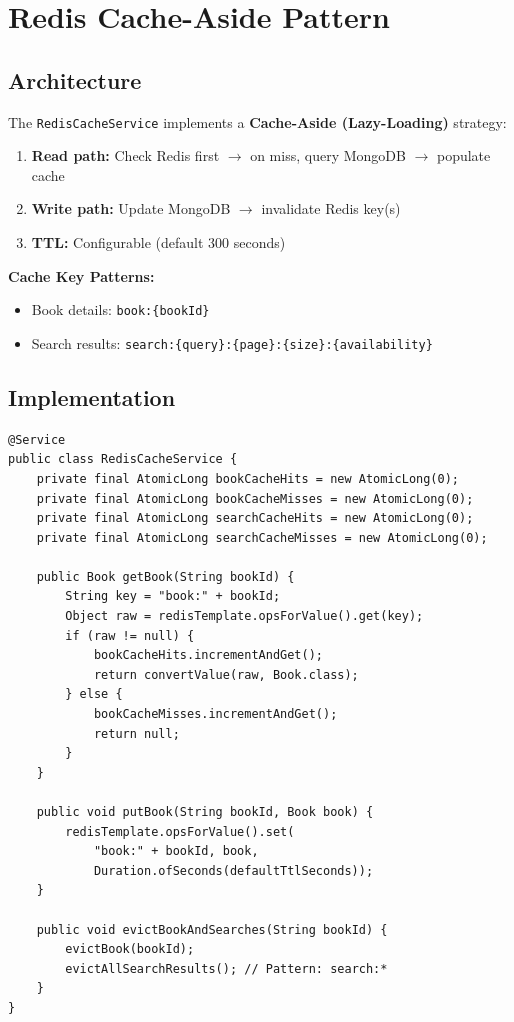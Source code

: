 \documentclass[12pt,a4paper]{report}
\begin{document}
\section{Redis Cache-Aside Pattern}

\subsection{Architecture}
The \texttt{RedisCacheService} implements a \textbf{Cache-Aside (Lazy-Loading)} strategy:
\begin{enumerate}[noitemsep]
    \item \textbf{Read path:} Check Redis first $\rightarrow$ on miss, query MongoDB $\rightarrow$ populate cache
    \item \textbf{Write path:} Update MongoDB $\rightarrow$ invalidate Redis key(s)
    \item \textbf{TTL:} Configurable (default 300 seconds)
\end{enumerate}

\textbf{Cache Key Patterns:}
\begin{itemize}[noitemsep]
    \item Book details: \texttt{book:\{bookId\}}
    \item Search results: \texttt{search:\{query\}:\{page\}:\{size\}:\{availability\}}
\end{itemize}

\subsection{Implementation}
\begin{lstlisting}[style=JavaStyle, caption={RedisCacheService.java -- Cache-Aside with Observability}]
@Service
public class RedisCacheService {
    private final AtomicLong bookCacheHits = new AtomicLong(0);
    private final AtomicLong bookCacheMisses = new AtomicLong(0);
    private final AtomicLong searchCacheHits = new AtomicLong(0);
    private final AtomicLong searchCacheMisses = new AtomicLong(0);

    public Book getBook(String bookId) {
        String key = "book:" + bookId;
        Object raw = redisTemplate.opsForValue().get(key);
        if (raw != null) {
            bookCacheHits.incrementAndGet();
            return convertValue(raw, Book.class);
        } else {
            bookCacheMisses.incrementAndGet();
            return null;
        }
    }

    public void putBook(String bookId, Book book) {
        redisTemplate.opsForValue().set(
            "book:" + bookId, book,
            Duration.ofSeconds(defaultTtlSeconds));
    }

    public void evictBookAndSearches(String bookId) {
        evictBook(bookId);
        evictAllSearchResults(); // Pattern: search:*
    }
}
\end{lstlisting}
\end{document}
